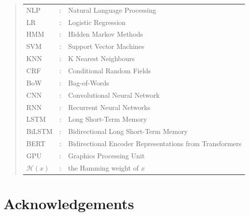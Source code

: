 \documentclass[ %
                    author={Louis Wang},
                supervisor={Dr. Qiang Liu},
                    degree={MSc},
                     title={Identification of Suicide Ideation in Texts},
                      type={},
                      year={2024}]{dissertation}
\begin{document}
\begin{quote}
\noindent
\begin{tabular}{lcl}
      NLP &: & Natural Language Processing \\
      LR &: & Logistic Regression \\
      HMM &: & Hidden Markov Methods \\
      SVM &: & Support Vector Machines \\
      KNN &: & K Nearest Neighbours \\
      CRF &: & Conditional Random Fields \\
      BoW &: & Bag-of-Words \\
      CNN &: & Convolutional Neural Network \\
      RNN &: & Recurrent Neural Networks \\
      LSTM &: & Long Short-Term Memory \\
      BiLSTM &: & Bidirectional Long Short-Term Memory \\
      BERT &: & Bidirectional Encoder Representations from Transformers \\
      GPU &: & Graphics Processing Unit \\
      ${\mathcal H}( x )$ &: & the Hamming weight of $x$ \\
\end{tabular}
\end{quote}


\chapter*{Acknowledgements}

\noindent


%
\end{document}
